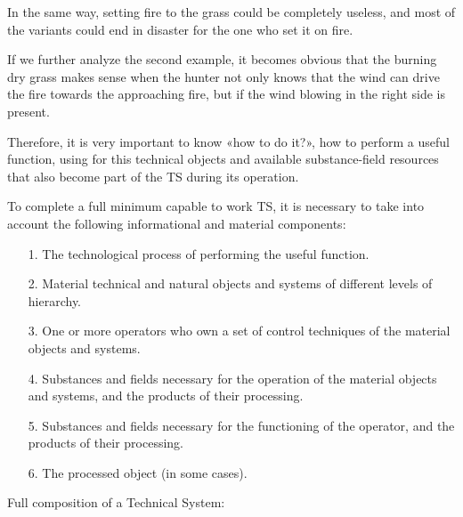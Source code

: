 \documentclass[11pt,a4paper]{article}
\begin{document}
In the same way, setting fire to the grass could be completely useless, and
most of the variants could end in disaster for the one who set it on fire.

If we further analyze the second example, it becomes obvious that the burning
dry grass makes sense when the hunter not only knows that the wind can drive
the fire towards the approaching fire, but if the wind blowing in the right
side is present.

Therefore, it is very important to know «how to do it?», how to perform a
useful function, using for this technical objects and available
substance-field resources that also become part of the TS during its
operation.

To complete a full minimum capable to work TS, it is necessary to take
into account the following informational and material components:
\begin{itemize}[noitemsep]
\item[1.] The technological process of performing the useful function.
\item[2.] Material technical and natural objects and systems of different
  levels of hierarchy.
\item[3.] One or more operators who own a set of control techniques of the
  material objects and systems.
\item[4.] Substances and fields necessary for the operation of the material
  objects and systems, and the products of their processing.
\item[5.] Substances and fields necessary for the functioning of the operator,
  and the products of their processing.
\item[6.] The processed object (in some cases).  
\end{itemize}
Full composition of a Technical System:
\end{document}
